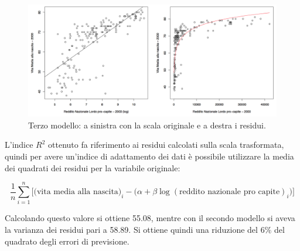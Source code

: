 \begin{figure}[htbp]
	\centering
	\includegraphics[width=.9\textwidth]{./notes/immagini/l7-fig8.png}
	\caption{Terzo modello: a sinistra con la scala originale e a destra i residui.}
\end{figure}

L'indice $ R^2 $ ottenuto fa riferimento ai residui calcolati sulla scala trasformata, quindi per avere un'indice di adattamento dei dati è possibile utilizzare la media dei quadrati dei residui per la variabile originale:

$$
\frac{1}{n}\sum\limits_{i=1}^n \Big[ \big(\text{vita media alla nascita}\big)_i - \big(\alpha + \beta \log(\text{reddito nazionale pro capite})_i\big)\Big]
$$

Calcolando questo valore si ottiene 55.08, mentre con il secondo modello si aveva la varianza dei residui pari a 58.89. Si ottiene quindi una riduzione del $ 6\% $ del quadrato degli errori di previsione.









